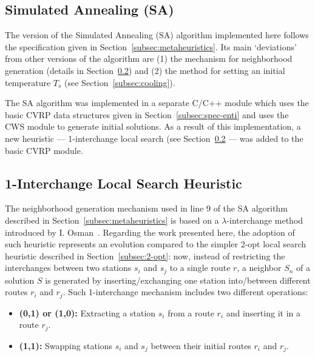 \subsection{Simulated Annealing (SA)}
\label{subsec:sa}

The version of the Simulated Annealing (SA) algorithm implemented here follows 
the specification given in Section~\ref{subsec:metaheuristics}. Its main 
`deviations' from other versions of the algorithm are (1) the mechanism for 
neighborhood generation (details in Section~\ref{subsec:1-ichange}) and (2) the 
method for setting an initial temperature $T_s$ (see 
Section~\ref{subsec:cooling}).\vertbreak

The SA algorithm was implemented in a separate C\slash C++ module which uses 
the basic CVRP data structures given in Section~\ref{subsec:spec-enti} and uses 
the CWS module to generate initial solutions. As a result of this 
implementation, a new heuristic --- 1-interchange local search (see 
Section~\ref{subsec:1-ichange} --- was added to the basic CVRP module.

\subsection{1-Interchange Local Search Heuristic}
\label{subsec:1-ichange}

The neighborhood generation mechanism used in line 9 of the SA algorithm 
described in Section~\ref{subsec:metaheuristics} is based on 
a $\lambda$-interchange method introduced by 
I. Osman~\cite{Osman1993,Thangiahl1996,Toth2002}. Regarding the work presented 
here, the 
adoption of such heuristic represents an evolution compared to the 
simpler 2-opt local search heuristic described in Section~\ref{subsec:2-opt}: 
now, instead of restricting the interchanges between two stations $s_i$ and 
$s_j$ to a single route $r$, a neighbor $S_n$ of a solution $S$ is 
generated by inserting\slash exchanging one station into\slash between 
different routes $r_i$ and $r_j$. Such 1-interchange mechanism includes two 
different operations:

\begin{itemize}

    \item \textbf{(0,1) or (1,0):} Extracting a station $s_i$ from a route 
        $r_i$ and inserting it in a route $r_j$.
    \item \textbf{(1,1):} Swapping stations $s_i$ and $s_j$ between their 
        initial routes $r_i$ and $r_j$.

\end{itemize}\vertbreak

